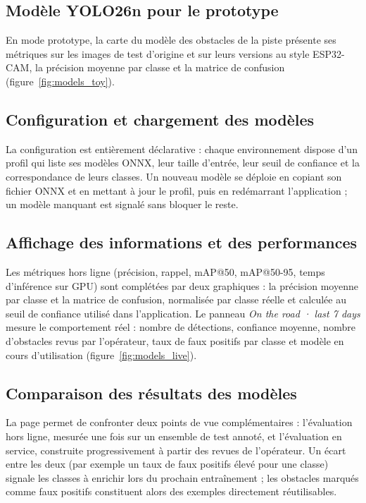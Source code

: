 
\subsection{Modèle YOLO26n pour le prototype}
En mode prototype, la carte du modèle des obstacles de la piste présente ses métriques sur les images de test
d'origine et sur leurs versions au style ESP32-CAM, la précision moyenne par classe et la matrice de confusion
(figure~\ref{fig:models_toy}).


\subsection{Configuration et chargement des modèles}
La configuration est entièrement déclarative : chaque environnement dispose d'un profil qui liste ses modèles ONNX,
leur taille d'entrée, leur seuil de confiance et la correspondance de leurs classes. Un nouveau modèle se déploie en
copiant son fichier ONNX et en mettant à jour le profil, puis en redémarrant l'application ; un modèle manquant est
signalé sans bloquer le reste.

\subsection{Affichage des informations et des performances}
Les métriques hors ligne (précision, rappel, mAP@50, mAP@50-95, temps d'inférence sur GPU) sont complétées par deux
graphiques : la précision moyenne par classe et la matrice de confusion, normalisée par classe réelle et calculée au
seuil de confiance utilisé dans l'application. Le panneau \emph{On the road · last 7 days} mesure le comportement
réel : nombre de détections, confiance moyenne, nombre d'obstacles revus par l'opérateur, taux de faux positifs par
classe et modèle en cours d'utilisation (figure~\ref{fig:models_live}).


\subsection{Comparaison des résultats des modèles}
La page permet de confronter deux points de vue complémentaires : l'évaluation hors ligne, mesurée une fois sur un
ensemble de test annoté, et l'évaluation en service, construite progressivement à partir des revues de l'opérateur.
Un écart entre les deux (par exemple un taux de faux positifs élevé pour une classe) signale les classes à enrichir
lors du prochain entraînement ; les obstacles marqués comme faux positifs constituent alors des exemples
directement réutilisables.

